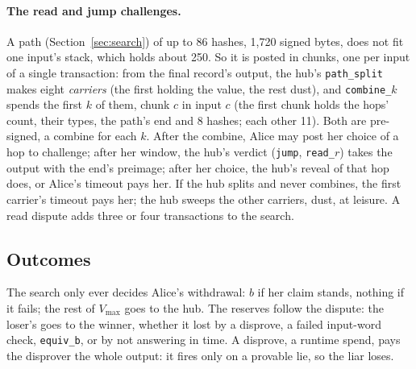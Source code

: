 \documentclass[11pt]{article}
\newcommand{\vmax}{V_{\max}}
\newcommand{\tx}[1]{\texttt{#1}}
\begin{document}
\paragraph{The read and jump challenges.} A path (Section~\ref{sec:search})
of up to 86 hashes, 1,720 signed bytes, does not fit one input's stack,
which holds about 250. So it is posted in chunks, one per input of a
single transaction: from the final record's output, the hub's
\tx{path\_split} makes eight \emph{carriers} (the first holding the
value, the rest dust), and \tx{combine\_$k$} spends the first $k$ of
them, chunk $c$ in input $c$ (the first chunk holds the hops' count,
their types, the path's end and 8 hashes; each other 11). Both are
pre-signed, a combine for each $k$. After the combine, Alice may post her
choice of a hop to challenge; after her window, the hub's verdict
(\tx{jump}, \tx{read\_$r$}) takes the output with the end's preimage;
after her choice, the hub's reveal of that hop does, or Alice's timeout
pays her. If the hub splits and never combines, the first carrier's
timeout pays her; the hub sweeps the other carriers, dust, at leisure. A
read dispute adds three or four transactions to the search.

\subsection{Outcomes}
\label{sec:outcomes}

The search only ever decides Alice's withdrawal: $b$ if her claim
stands, nothing if it fails; the rest of $\vmax$ goes to the hub. The
reserves follow the dispute: the loser's goes to the winner, whether it
lost by a disprove, a failed input-word check, \tx{equiv\_b}, or by not
answering in time. A disprove, a runtime spend, pays the disprover the
whole output: it fires only on a provable lie, so the liar loses.
\end{document}
